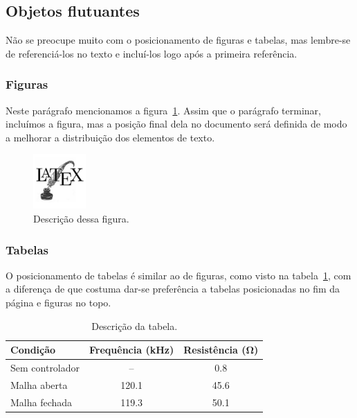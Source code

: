\documentclass[a4paper,11pt]{article}
\begin{document}
\subsection{Objetos flutuantes}

Não se preocupe muito com o posicionamento de figuras e tabelas, mas lembre-se de referenciá-los no texto e incluí-los logo após a primeira referência.

\subsubsection{Figuras}

Neste parágrafo mencionamos a figura~\ref{fig:exemplo}.
Assim que o parágrafo terminar, incluímos a figura, mas a posição final dela no documento será definida de modo a melhorar a distribuição dos elementos de texto.

\begin{figure}[htp]
\centering
\includegraphics[width=2cm]{exemplo}
\caption{Descrição dessa figura.}
\label{fig:exemplo}
\end{figure}

\subsubsection{Tabelas}

O posicionamento de tabelas é similar ao de figuras, como visto na tabela~\ref{tab:exemplo}, com a diferença de que costuma dar-se preferência a tabelas posicionadas no fim da página e figuras no topo.

\begin{table}[hbp]
\centering
\caption{Descrição da tabela.}
\label{tab:exemplo}
\begin{tabular}{lcc}
\toprule
Condição & Frequência (\si{kHz}) & Resistência (\si{\ohm}) \\
\midrule
Sem controlador & -- & \num{0.8} \\
Malha aberta & \num{120.1} & \num{45.6} \\
Malha fechada & \num{119.3} & \num{50.1} \\
\bottomrule
\end{tabular}
\end{table}



\end{document}
